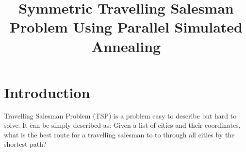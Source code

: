 \documentclass[conference]{IEEEtran}
\begin{document}
%
\title{Symmetric Travelling Salesman Problem Using Parallel Simulated Annealing}


\author{
}


\maketitle

\begin{abstract}



\end{abstract}




%
\IEEEpeerreviewmaketitle



\section{Introduction}

Travelling Salesman Problem (TSP)\cite{lawler1985traveling} is a problem easy to describe but hard to solve. It can be simply described as: Given a list of cities and their coordinates, what is the best route for a travelling salesman to to through all cities by the shortest path? 
\end{document}
